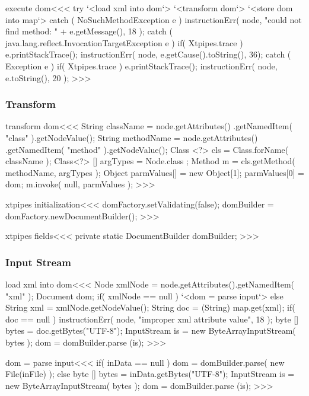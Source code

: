 \documentclass{article}
\begin{document}
{\<execute dom\><<<
try{
   `<load xml into dom`>
   `<transform dom`>
   `<store dom into map`>
} catch ( NoSuchMethodException e ){
   instructionErr( node,
       "could not find method: " + e.getMessage(), 18 );
} catch ( java.lang.reflect.InvocationTargetException e ){
   if( Xtpipes.trace ){ e.printStackTrace(); }
   instructionErr( node, e.getCause().toString(), 36);
} catch ( Exception e ){
   if( Xtpipes.trace ){ e.printStackTrace(); }
   instructionErr( node, e.toString(), 20 );
}
>>>



\subsubsection{Transform}


\<transform dom\><<<
String className = node.getAttributes()
             .getNamedItem( "class" ).getNodeValue();
String methodName = node.getAttributes()
             .getNamedItem( "method" ).getNodeValue();
Class <?> cls = Class.forName( className );
Class<?>  [] argTypes = { Node.class };
Method m = cls.getMethod( methodName, argTypes );
Object parmValues[] = new Object[1];
parmValues[0] = dom;
m.invoke( null, parmValues );
>>>

\<xtpipes initialization\><<<
domFactory.setValidating(false);
domBuilder = domFactory.newDocumentBuilder();
>>>

\<xtpipes fields\><<<
private static DocumentBuilder domBuilder;
>>>



\subsubsection{Input Stream}


\<load xml into dom\><<<
Node xmlNode = node.getAttributes().getNamedItem( "xml" );
Document dom;
if( xmlNode == null ){
   `<dom = parse input`>
} else {
   String xml = xmlNode.getNodeValue();
   String doc = (String) map.get(xml);
   if( doc == null ){
      instructionErr( node, "improper xml attribute value", 18 );
   }
   byte [] bytes = doc.getBytes("UTF-8");
   InputStream is = new ByteArrayInputStream( bytes );
   dom = domBuilder.parse (is);
}
>>>

\<dom = parse input\><<<
if( inData == null ){
   dom = domBuilder.parse( new File(inFile) );
} else {
   byte [] bytes = inData.getBytes("UTF-8");
   InputStream is =  new ByteArrayInputStream( bytes );
   dom = domBuilder.parse (is);}
>>>



}
\end{document}
